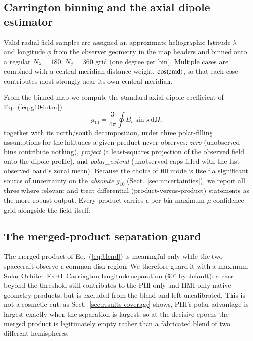 \documentclass{aa}
\begin{document}
\subsection{Carrington binning and the axial dipole estimator}
\label{sec:methods-dipole}

Valid radial-field samples are assigned an approximate heliographic latitude $\lambda$ and longitude $\phi$ from the observer geometry in the map headers and binned onto a regular $N_\lambda = 180$, $N_\phi = 360$ grid (one degree per bin). Multiple cases are combined with a central-meridian-distance weight, $\cos(\rm cmd)$, so that each case contributes most strongly near its own central meridian.

From the binned map we compute the standard axial dipole coefficient of Eq.~(\ref{eq:g10-intro}),
\begin{equation}
    g_{10} = \frac{3}{4\pi} \oint B_r \sin\lambda \, \mathrm{d}\Omega ,
    \label{eq:g10}
\end{equation}
together with its north/south decomposition, under three polar-filling assumptions for the latitudes a given product never observes: \emph{zero} (unobserved bins contribute nothing), \emph{project} (a least-squares projection of the observed field onto the dipole profile), and \emph{polar\_extend} (unobserved caps filled with the last observed band's zonal mean). Because the choice of fill mode is itself a significant source of uncertainty on the \emph{absolute} $g_{10}$ (Sect.~\ref{sec:uncertainties}), we report all three where relevant and treat differential (product-versus-product) statements as the more robust output. Every product carries a per-bin maximum-$\mu$ confidence grid alongside the field itself.

\subsection{The merged-product separation guard}
\label{sec:methods-guard}

The merged product of Eq.~(\ref{eq:blend}) is meaningful only while the two spacecraft observe a common disk region. We therefore guard it with a maximum Solar Orbiter--Earth Carrington-longitude separation (60$^{\circ}$ by default): a case beyond the threshold still contributes to the PHI-only and HMI-only native-geometry products, but is excluded from the blend and left uncalibrated. This is not a cosmetic cut: as Sect.~\ref{sec:results-coverage} shows, PHI's polar advantage is largest exactly when the separation is largest, so at the decisive epochs the merged product is legitimately empty rather than a fabricated blend of two different hemispheres.
\end{document}
